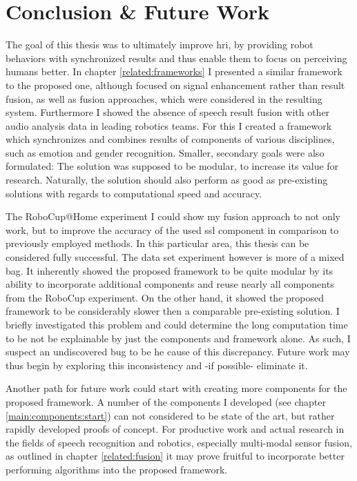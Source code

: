 

\chapter{Conclusion \& Future Work}
\label{conclusion}

The goal of this thesis was to ultimately improve \gls{hri}, by providing robot behaviors with synchronized results and thus enable them to focus on perceiving humans better.
In chapter \ref{related:frameworks} I presented a similar framework to the proposed one, although focused on signal enhancement rather than result fusion, as well as fusion approaches, which were considered in the resulting system.
Furthermore I showed the absence of speech result fusion with other audio analysis data in leading robotics teams.
For this I created a framework which synchronizes and combines results of components of various disciplines, such as emotion and gender recognition.
Smaller, secondary goals were also formulated:
The solution was supposed to be modular, to increase its value for research.
Naturally, the solution should also perform as good as pre-existing solutions with regards to computational speed and accuracy.

The RoboCup@Home experiment I could show my fusion approach to not only work, but to improve the accuracy of the used \gls{ssl} component in comparison to previously employed methods.
In this particular area, this thesis can be considered fully successful.
The data set experiment however is more of a mixed bag.
It inherently showed the proposed framework to be quite modular by its ability to incorporate additional components and reuse nearly all components from the RoboCup experiment.
On the other hand, it showed the proposed framework to be considerably slower then a comparable pre-existing solution.
I briefly investigated this problem and could determine the long computation time to be not be explainable by just the components and framework alone.
As such, I suspect an undiscovered bug to be he cause of this discrepancy.
Future work may thus begin by exploring this inconsistency and -if possible- eliminate it.

Another path for future work could start with creating more components for the proposed framework.
A number of the components I developed (see chapter \ref{main:components:start}) can not considered to be state of the art, but rather rapidly developed proofs of concept.
For productive work and actual research in the fields of speech recognition and robotics, especially multi-modal sensor fusion, as outlined in chapter \ref{related:fusion} it may prove fruitful to incorporate better performing algorithms into the proposed framework.


